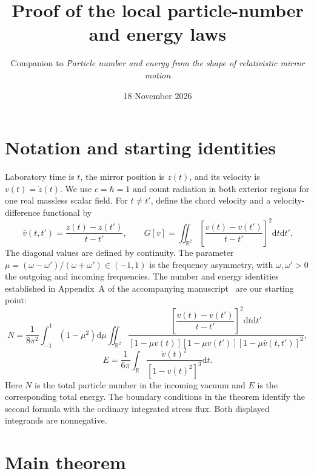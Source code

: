 \documentclass[11pt]{article}
\title{Proof of the local particle-number and energy laws}
\author{Companion to \emph{Particle number and energy from the shape of relativistic mirror motion}}
\date{18 November 2026}
\newcommand{\dd}{\mathrm d}
\newcommand{\R}{\mathbb R}
\begin{document}
\maketitle
\section{Notation and starting identities}
Laboratory time is $t$, the mirror position is $z(t)$, and its velocity
is $v(t)=\dot z(t)$. We use $c=\hbar=1$ and count radiation in both
exterior regions for one real massless scalar field. For $t\ne t'$,
define the chord velocity and a velocity-difference functional by
\begin{equation}
 \bar v(t,t')=\frac{z(t)-z(t')}{t-t'},\qquad
 G[v]=\iint_{\R^2}\left[\frac{v(t)-v(t')}{t-t'}\right]^2\dd t\dd t'.
 \label{eq:G}
\end{equation}
The diagonal values are defined by continuity. The parameter
$\mu=(\omega-\omega')/(\omega+\omega')\in(-1,1)$ is the frequency
asymmetry, with $\omega,\omega'>0$ the outgoing and incoming frequencies.
The number and energy identities established in Appendix~A of the
accompanying manuscript~\cite{MirrorCountsManuscript} are our starting
point:
\begin{equation}
 N=\frac1{8\pi^2}\int_{-1}^1(1-\mu^2)\dd\mu
 \iint_{\R^2}
 \frac{\left[\dfrac{v(t)-v(t')}{t-t'}\right]^2\dd t\dd t'}
 {[1-\mu v(t)][1-\mu v(t')][1-\mu\bar v(t,t')]^2},
 \label{eq:pn-positive-number_appendix}
\end{equation}
\begin{equation}
 E=\frac1{6\pi}\int_\R\frac{\dot v(t)^2}{[1-v(t)^2]^3}\dd t.
 \label{eq:energy-positive-functional}
\end{equation}
Here $N$ is the total particle number in the incoming vacuum and $E$
is the corresponding total energy. The boundary conditions in the
theorem identify the second formula with the ordinary integrated
stress flux. Both displayed integrands are nonnegative.

\section{Main theorem}
\end{document}
